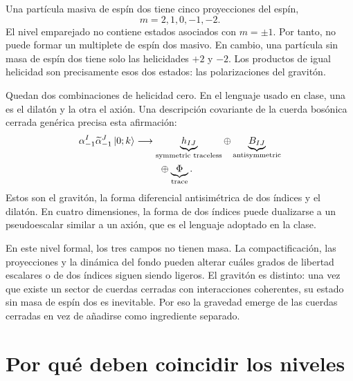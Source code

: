 Una partícula masiva de espín dos tiene cinco proyecciones del espín,
\begin{equation}
  m=2,1,0,-1,-2.
\end{equation}
El nivel emparejado no contiene estados asociados con \(m=\pm1\). Por tanto, no puede formar un multiplete de espín dos masivo. En cambio, una partícula sin masa de espín dos tiene solo las helicidades \(+2\) y \(-2\). Los productos de igual helicidad son precisamente esos dos estados: las polarizaciones del gravitón.

Quedan dos combinaciones de helicidad cero. En el lenguaje usado en clase, una es el dilatón y la otra el axión. Una descripción covariante de la cuerda bosónica cerrada genérica precisa esta afirmación:
\begin{equation}
  \begin{aligned}
    \alpha_{-1}^{I}\widetilde\alpha_{-1}^{J}\left\lvert0;k\right\rangle
    &\longrightarrow
    \underbrace{h_{IJ}}_{\text{symmetric traceless}}
    \oplus
    \underbrace{B_{IJ}}_{\text{antisymmetric}}\\
    &\hspace{2.5em}\oplus
    \underbrace{\Phi}_{\text{trace}}.
  \end{aligned}
  \label{eq:l04-massless-tensor-decomposition}
\end{equation}
Estos son el gravitón, la forma diferencial antisimétrica de dos índices y el dilatón. En cuatro dimensiones, la forma de dos índices puede dualizarse a un pseudoescalar similar a un axión, que es el lenguaje adoptado en la clase.

En este nivel formal, los tres campos no tienen masa. La compactificación, las proyecciones y la dinámica del fondo pueden alterar cuáles grados de libertad escalares o de dos índices siguen siendo ligeros. El gravitón es distinto: una vez que existe un sector de cuerdas cerradas con interacciones coherentes, su estado sin masa de espín dos es inevitable. Por eso la gravedad emerge de las cuerdas cerradas en vez de añadirse como ingrediente separado.

\section{Por qué deben coincidir los niveles}

